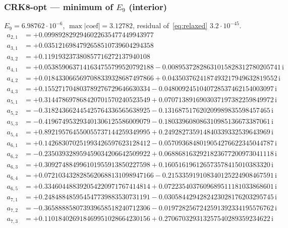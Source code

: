 \subsubsection*{CRK8-opt --- minimum of $E_9$ (interior)}
$E_{9}=6.98762\cdot10^{-6}$, $\max|\text{coef}|=3.12782$, residual of~\eqref{eq:relaxed} $3.2\cdot10^{-45}$.
{\small\allowdisplaybreaks
\begin{align*}
a_{2,1} &= +0.0998928292946022635477449943977\\
a_{3,1} &= +0.0351216984792658510739604294358\\
a_{3,2} &= +0.119193237380857716272137940108\\
a_{4,1} &= +0.0538590637141634755799520792188 - 0.00895372828631015828312780205741\,\mathrm{i}\\
a_{4,2} &= +0.0184330665697088339328687497866 + 0.0435037624187493217949632819552\,\mathrm{i}\\
a_{4,3} &= +0.155271704803789276729646630334 - 0.0480092451040728537462154003097\,\mathrm{i}\\
a_{5,1} &= +0.314478697868420701570240523549 + 0.0707138916903037197382259849972\,\mathrm{i}\\
a_{5,2} &= -0.318243662445425764336565638925 - 0.131687517620209989835598457465\,\mathrm{i}\\
a_{5,3} &= -0.419674953293401306125586009079 - 0.180339608086310985136673387061\,\mathrm{i}\\
a_{5,4} &= +0.892195764550055737144259349995 + 0.249282735914840339332539643969\,\mathrm{i}\\
a_{6,1} &= +0.142683070251993426597623128412 - 0.0570936848019054276622345044787\,\mathrm{i}\\
a_{6,2} &= -0.235039328959459034206642509922 + 0.0688681632921823677200973041118\,\mathrm{i}\\
a_{6,3} &= +0.309274884996101955913850227598 + 0.160516196126573578415010383320\,\mathrm{i}\\
a_{6,4} &= +0.0721034328285620688131098947166 - 0.215335919108340125224908467591\,\mathrm{i}\\
a_{6,5} &= +0.334604488392054220971767414814 + 0.0722354037609689511181033868601\,\mathrm{i}\\
a_{7,1} &= +0.248488485954547739883530731191 - 0.0305844294282423028176203295745\,\mathrm{i}\\
a_{7,2} &= -0.365888858073939658518240712306 - 0.0197282567242591392334195576762\,\mathrm{i}\\
a_{7,3} &= +0.110184026918469951028664230156 + 0.270670329313257540289359234622\,\mathrm{i}\\

\end{align*}}
